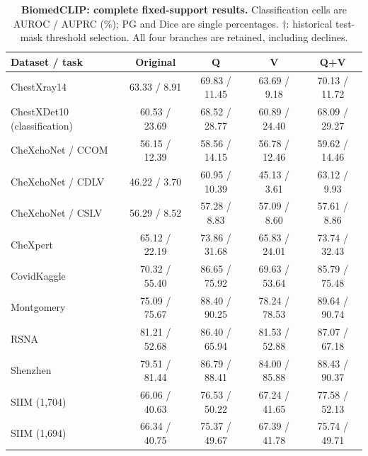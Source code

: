 \begin{table}[tp]
\centering
\caption{\textbf{BiomedCLIP: complete fixed-support results.} Classification cells are AUROC / AUPRC (\%); PG and Dice are single percentages. $\dagger$: historical test-mask threshold selection. All four branches are retained, including declines.}
\label{tab:supp-fixed-biomedclip}
\small
\setlength{\tabcolsep}{4pt}
\begin{tabular*}{\textwidth}{@{\extracolsep{\fill}}lcccc@{}}
\toprule
Dataset / task & Original & Q & V & Q+V \\
\midrule
ChestXray14 & 63.33 / 8.91 & 69.83 / 11.45 & 63.69 / 9.18 & 70.13 / 11.72 \\
ChestXDet10 (classification) & 60.53 / 23.69 & 68.52 / 28.77 & 60.89 / 24.40 & 68.09 / 29.27 \\
CheXchoNet / CCOM & 56.15 / 12.39 & 58.56 / 14.15 & 56.78 / 12.46 & 59.62 / 14.46 \\
CheXchoNet / CDLV & 46.22 / 3.70 & 60.95 / 10.39 & 45.13 / 3.61 & 63.12 / 9.93 \\
CheXchoNet / CSLV & 56.29 / 8.52 & 57.28 / 8.83 & 57.09 / 8.60 & 57.61 / 8.86 \\
CheXpert & 65.12 / 22.19 & 73.86 / 31.68 & 65.83 / 24.01 & 73.74 / 32.43 \\
CovidKaggle & 70.32 / 55.40 & 86.65 / 75.92 & 69.63 / 53.64 & 85.79 / 75.48 \\
Montgomery & 75.09 / 75.67 & 88.40 / 90.25 & 78.24 / 78.53 & 89.64 / 90.74 \\
RSNA & 81.21 / 52.68 & 86.40 / 65.94 & 81.53 / 52.88 & 87.07 / 67.18 \\
Shenzhen & 79.51 / 81.44 & 86.79 / 88.41 & 84.00 / 85.88 & 88.43 / 90.37 \\
SIIM (1,704) & 66.06 / 40.63 & 76.53 / 50.22 & 67.24 / 41.65 & 77.58 / 52.13 \\
SIIM (1,694) & 66.34 / 40.75 & 75.37 / 49.67 & 67.39 / 41.78 & 75.74 / 49.71 \\
\bottomrule
\end{tabular*}
\end{table}

